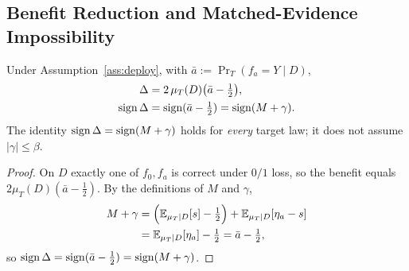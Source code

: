 
\subsection{Benefit Reduction and Matched-Evidence Impossibility}

\begin{lemma}\label{lem:reduction}
Under Assumption~\ref{ass:deploy}, with $\bar a:=\Pr_T(f_a{=}Y\mid D)$,
\begin{align*}
\Delta &= 2\,\mu_T(D)\bigl(\bar a-\tfrac12\bigr),\\
\operatorname{sign}\Delta &= \operatorname{sign}(\bar a-\tfrac12)=\operatorname{sign}(M+\gamma).
\end{align*}
The identity $\operatorname{sign}\Delta=\operatorname{sign}(M+\gamma)$ holds for \emph{every} target law; it does not
assume $|\gamma|\le\beta$.
\end{lemma}
\begin{proof}
On $D$ exactly one of $f_0,f_a$ is correct under $0/1$ loss, so the benefit equals
$2\mu_T(D)(\bar a-\tfrac12)$. By the definitions of $M$ and $\gamma$,
\begin{align*}
M+\gamma
&=\Bigl(\mathbb{E}_{\mu_T\mid D}[s]-\tfrac12\Bigr)
  +\mathbb{E}_{\mu_T\mid D}[\eta_a-s]\\
&=\mathbb{E}_{\mu_T\mid D}[\eta_a]-\tfrac12
 =\bar a-\tfrac12,
\end{align*}
so $\operatorname{sign}\Delta=\operatorname{sign}(\bar a-\tfrac12)=\operatorname{sign}(M+\gamma)$.
\end{proof}

